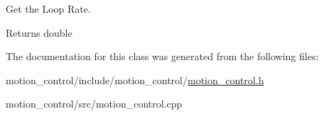 Get the Loop Rate. 

\begin{DoxyReturn}{Returns}
double 
\end{DoxyReturn}


The documentation for this class was generated from the following files\+:\begin{DoxyCompactItemize}
\item 
motion\+\_\+control/include/motion\+\_\+control/\hyperlink{motion__control_8h}{motion\+\_\+control.\+h}\item 
motion\+\_\+control/src/motion\+\_\+control.\+cpp\end{DoxyCompactItemize}
